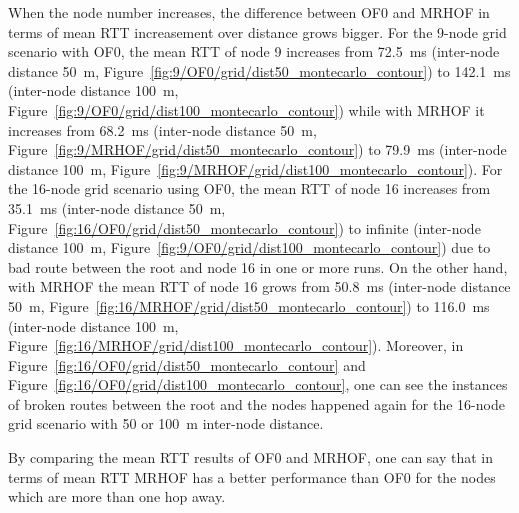 When the node number increases, the difference between OF0 and MRHOF in terms of mean RTT increasement over distance grows bigger. For the 9-node grid scenario with OF0, the mean RTT of node 9 increases from 72.5~ms (inter-node distance 50~m, Figure~\ref{fig:9/OF0/grid/dist50_montecarlo_contour}) to 142.1~ms (inter-node distance 100~m, Figure~\ref{fig:9/OF0/grid/dist100_montecarlo_contour}) while with MRHOF it increases from 68.2~ms (inter-node distance 50~m, Figure~\ref{fig:9/MRHOF/grid/dist50_montecarlo_contour}) to 79.9~ms (inter-node distance 100~m, Figure~\ref{fig:9/MRHOF/grid/dist100_montecarlo_contour}). For the 16-node grid scenario using OF0, the mean RTT of node 16 increases from 35.1~ms (inter-node distance 50~m, Figure~\ref{fig:16/OF0/grid/dist50_montecarlo_contour}) to infinite (inter-node distance 100~m, Figure~\ref{fig:9/OF0/grid/dist100_montecarlo_contour}) due to bad route between the root and node 16 in one or more runs. On the other hand, with MRHOF the mean RTT of node 16 grows from 50.8~ms (inter-node distance 50~m, Figure~\ref{fig:16/MRHOF/grid/dist50_montecarlo_contour}) to 116.0~ms (inter-node distance 100~m, Figure~\ref{fig:16/MRHOF/grid/dist100_montecarlo_contour}). Moreover, in Figure~\ref{fig:16/OF0/grid/dist50_montecarlo_contour} and Figure~\ref{fig:16/OF0/grid/dist100_montecarlo_contour}, one can see the instances of broken routes between the root and the nodes happened again for the 16-node grid scenario with 50 or 100~m inter-node distance.

By comparing the mean RTT results of OF0 and MRHOF, one can say that in terms of mean RTT MRHOF has a better performance than OF0 for the nodes which are more than one hop away.

